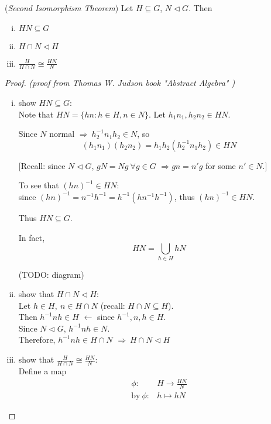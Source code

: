 \documentclass{article}
\theoremstyle{definition}
\newenvironment{thm}[1]
{\renewcommand\theinnerthm{#1}\innerthm}
{\endinnerthm}
\begin{document}
\begin{thm}{}(\emph{Second Isomorphism Theorem}) \label{2ndisothm}
  Let $H \subseteq G$, $N \triangleleft G$. Then
  \begin{enumerate}[i.]
    \item $HN \subseteq G$
    \item $H \cap N \triangleleft H$
    \item $\frac{H}{H \cap N} \cong \frac{HN}{N}$
  \end{enumerate}
\end{thm}
\begin{proof}
  \emph{(proof from Thomas W. Judson book "Abstract Algebra" \cite{judson})}\\

  \begin{enumerate}[i.]
    \item show $HN \subseteq G$:\\
      Note that $HN = \{ hn : h\in H, n\in N \}$. Let $h_1 n_1, h_2 n_2 \in HN$.

      Since $N$ normal $\Longrightarrow~ h_2^{-1} n_1 h_2 \in N$, so
      $$(h_1 n_1)(h_2 n_2) = h_1 h_2 (h_2^{-1} n_1 h_2) \in HN$$

      [Recall: since $N \triangleleft G$, $gN=Ng ~\forall g \in G$ $\Longrightarrow gn=n'g$ for some $n' \in N$.]

      To see that $(hn)^{-1} \in HN$:\\
      since $(hn)^{-1} = n^{-1} h^{-1} = h^{-1} (h n^{-1} h^{-1})$, thus $(hn)^{-1} \in HN$.

      Thus $HN \subseteq G$.


      In fact, $$HN = \bigcup_{h \in H} hN$$

      (TODO: diagram)

    \item show that $H \cap N \triangleleft H$:\\
      Let $h \in H,~ n \in H \cap N$ (recall: $H \cap N \subseteq H$).\\
      Then $h^{-1}nh \in H$ $\longleftarrow$ since $h^{-1}, n, h \in H$.\\
      Since $N \triangleleft G$, $h^{-1} n h \in N$.\\
      Therefore, $h^{-1}nh \in H \cap N$ $\Longrightarrow~ H \cap N \triangleleft H$

    \item show that $\frac{H}{H \cap N} \cong \frac{HN}{N}$:\\
      Define a map
      \begin{align*}
	\phi: &H \longrightarrow \frac{HN}{N}\\
	\text{by}~ \phi: &h \longmapsto hN
      \end{align*}


\end{enumerate}
\end{proof}
\end{document}
